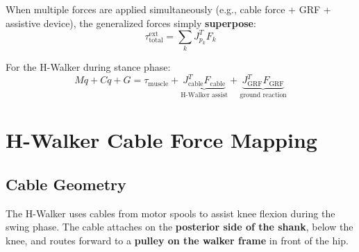 \documentclass[11pt,a4paper]{article}
\newcommand{\vc}[1]{\bm{#1}}
\newcommand{\mat}[1]{\bm{#1}}
\newcommand{\dt}[1]{\dot{#1}}
\newcommand{\ddt}[1]{\ddot{#1}}
\def\vc#1{#1}%
\def\mat#1{#1}%
\def\dt#1{#1}%
\def\ddt#1{#1}%
\def\bm#1{#1}%
\begin{document}
When multiple forces are applied simultaneously (e.g., cable force + GRF +
assistive device), the generalized forces simply \textbf{superpose}:
\begin{equation}
    \vc{\tau}^{\text{ext}}_{\text{total}} = \sum_{k} \vc{J}_{p_k}^T \vc{F}_k
    \label{eq:superposition}
\end{equation}

For the H-Walker during stance phase:
\begin{equation}
    \mat{M}\ddt{\vc{q}} + \vc{C}\dt{\vc{q}} + \vc{G}
    = \vc{\tau}_{\text{muscle}}
    + \underbrace{\vc{J}_{\text{cable}}^T \vc{F}_{\text{cable}}}_{\text{H-Walker assist}}
    + \underbrace{\vc{J}_{\text{GRF}}^T \vc{F}_{\text{GRF}}}_{\text{ground reaction}}
    \label{eq:eom_full_forces}
\end{equation}

\section{H-Walker Cable Force Mapping}
\label{sec:cable_mapping}

\subsection{Cable Geometry}

The H-Walker uses cables from motor spools to assist knee flexion during
the swing phase. The cable attaches on the \textbf{posterior side of the shank},
below the knee, and routes forward to a \textbf{pulley on the walker frame}
in front of the hip.
\end{document}
